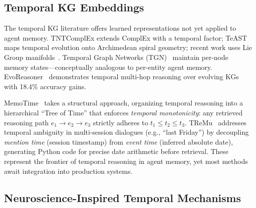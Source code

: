 \documentclass[hf]{ceurart}
\begin{document}
\subsection{Temporal KG Embeddings}

The temporal KG literature offers learned representations not yet applied
to agent memory. TNTComplEx extends ComplEx with a temporal factor;
TeAST maps temporal evolution onto Archimedean spiral geometry;
recent work uses Lie Group manifolds~\cite{tkgembed2025}. Temporal Graph
Networks (TGN)~\cite{tgn2020} maintain per-node memory states---conceptually
analogous to per-entity agent memory. EvoReasoner~\cite{evoreasoner2025}
demonstrates temporal multi-hop reasoning over evolving KGs with 18.4\%
accuracy gains.

MemoTime~\cite{memotime2025} takes a structural approach, organizing
temporal reasoning into a hierarchical ``Tree of Time'' that enforces
\emph{temporal monotonicity}: any retrieved reasoning path
$e_1 \to e_2 \to e_3$ strictly adheres to $t_1 \leq t_2 \leq t_3$.
TReMu~\cite{tremu2025} addresses temporal ambiguity in multi-session
dialogues (e.g., ``last Friday'') by decoupling \emph{mention time}
(session timestamp) from \emph{event time} (inferred absolute date),
generating Python code for precise date arithmetic before retrieval.
These represent the frontier of temporal reasoning in agent memory,
yet most methods await integration into production systems.

\subsection{Neuroscience-Inspired Temporal Mechanisms}
\end{document}

